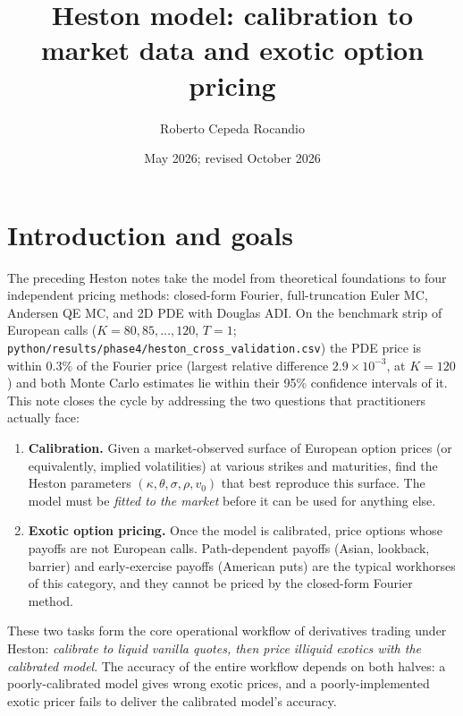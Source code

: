 \documentclass[11pt]{article}
\title{Heston model: calibration to market data and exotic option pricing}
\author{Roberto Cepeda Rocandio}
\date{May 2026; revised October 2026}
\theoremstyle{plain}
\theoremstyle{definition}
\theoremstyle{remark}
\begin{document}
\maketitle
\tableofcontents
\bigskip

\section{Introduction and goals}

The preceding Heston notes take the model from theoretical foundations to four independent pricing methods: closed-form Fourier, full-truncation Euler MC, Andersen QE MC, and 2D PDE with Douglas ADI. On the benchmark strip of European calls ($K = 80, 85, \dots, 120$, $T = 1$; \texttt{python/results/phase4/heston\_cross\_validation.csv}) the PDE price is within $0.3\%$ of the Fourier price (largest relative difference $2.9 \times 10^{-3}$, at $K = 120$) and both Monte Carlo estimates lie within their 95\% confidence intervals of it. This note closes the cycle by addressing the two questions that practitioners actually face:

\begin{enumerate}[topsep=2pt]
    \item \textbf{Calibration.} Given a market-observed surface of European option prices (or equivalently, implied volatilities) at various strikes and maturities, find the Heston parameters $(\kappa, \theta, \sigma, \rho, v_0)$ that best reproduce this surface. The model must be \emph{fitted to the market} before it can be used for anything else.

    \item \textbf{Exotic option pricing.} Once the model is calibrated, price options whose payoffs are not European calls. Path-dependent payoffs (Asian, lookback, barrier) and early-exercise payoffs (American puts) are the typical workhorses of this category, and they cannot be priced by the closed-form Fourier method.
\end{enumerate}

These two tasks form the core operational workflow of derivatives trading under Heston: \emph{calibrate to liquid vanilla quotes, then price illiquid exotics with the calibrated model}. The accuracy of the entire workflow depends on both halves: a poorly-calibrated model gives wrong exotic prices, and a poorly-implemented exotic pricer fails to deliver the calibrated model's accuracy.
\end{document}
